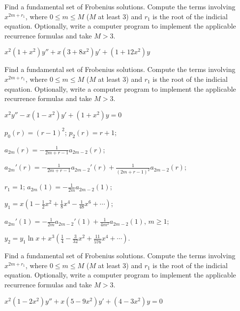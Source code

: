 \documentclass{ximera}
\begin{document}
\begin{problem}\label{exer:7.6.39}
Find a
fundamental set of Frobenius solutions. Compute the terms involving
$x^{2m+r_1}$, where $0\le m\le M$ ($M$ at least $3$) and $r_1$ is the
root of the indicial equation. Optionally, write a computer program to
implement the applicable recurrence formulas and take $M>3$.

$x^2(1+x^2)y''+x(3+8x^2)y'+(1+12x^2)y$
\end{problem}

\begin{problem}\label{exer:7.6.40}
Find a
fundamental set of Frobenius solutions. Compute the terms involving
$x^{2m+r_1}$, where $0\le m\le M$ ($M$ at least $3$) and $r_1$ is the
root of the indicial equation. Optionally, write a computer program to
implement the applicable recurrence formulas and take $M>3$.

$x^2y''-x(1-x^2)y'+(1+x^2)y=0$

\begin{solution}
    $p_0(r)=(r-1)^2$;
$p_2(r)=r+1$;

$a_{2m}(r)=-\frac{1}{2m+r-1}a_{2m-2}(r)$;


$a_{2m}'(r)=
-\frac{1}{2m+r-1}a_{2m-2}'(r)+\frac{1}{(2m+r-1)^2}a_{2m-2}(r)$;

$r_1=1$;
$a_{2m}(1)=-\frac{1}{2m}a_{2m-2}(1)$;

$y_1=x\left(1-\frac{1}{2}x^2+\frac{1}{8}x^4-\frac{1}{48}x^6+\cdots\right)$;

$a_{2m}'(1)=
-\frac{1}{2m}a_{2m-2}'(1)+\frac{1}{4m^2}a_{2m-2}(1)$,
$m\geq 1$;


$y_2=y_1 \ln x+x^3\left(\frac{1}{4}-\frac{3}{32}x^2+
\frac{11}{576}x^4+\cdots\right)$.
\end{solution}
\end{problem}

\begin{problem}\label{exer:7.6.41}
Find a
fundamental set of Frobenius solutions. Compute the terms involving
$x^{2m+r_1}$, where $0\le m\le M$ ($M$ at least $3$) and $r_1$ is the
root of the indicial equation. Optionally, write a computer program to
implement the applicable recurrence formulas and take $M>3$.

$x^2(1-2x^2)y''+x(5-9x^2)y'+(4-3x^2)y=0$
\end{problem}
\end{document}
